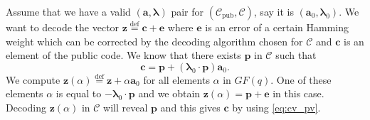 \documentclass[runningheads,11pt]{llncs}
\newcommand{\eqdef}{\stackrel{\text{def}}{=}}
\newcommand{\code}[1]{\ensuremath{\mathscr{#1}}}
\newcommand{\Cpub}{\code{C}_{\text{pub}}}
\newcommand{\CC}{\code{C}}
\newcommand{\scp}[2]{#1\cdot #2}
\newcommand{\word}[1]{\ensuremath{\boldsymbol{#1}}}
\newcommand{\av}{\word{a}}
\newcommand{\lambdav}{\word{\lambda}}
\newcommand{\cv}{\word{c}}
\newcommand{\ev}{\word{e}}
\newcommand{\pv}{\word{p}}
\newcommand{\zv}{\word{z}}
\newcommand{\fq}{GF(q)}
\begin{document}
Assume that we have a valid $(\av,\lambdav)$ pair for $(\Cpub,\CC)$, say it is $(\av_0,\lambdav_0)$.
We want to decode the vector $\zv \eqdef \cv +\ev$ where $\ev$ is an error of a certain Hamming weight which 
can be corrected by the decoding algorithm chosen for $\CC$ and $\cv$ is an element of the public code. We know that there exists 
$\pv$ in $\CC$ such that 
\begin{equation}
\label{eq:cv_pv}
\cv = \pv + (\scp{\lambdav_0}{\pv}) \av_0.
\end{equation}
We compute $\zv(\alpha) \eqdef \zv + \alpha \av_0$ for all elements 
$\alpha$ in $\fq$. One of these elements $\alpha$ is equal to $-\scp{\lambdav_0}{\pv}$  and 
we obtain $\zv(\alpha) = \pv + \ev$ in this case. Decoding $\zv(\alpha)$ in $\CC$ will reveal $\pv$ and
this gives $\cv$ by using \eqref{eq:cv_pv}.

 
\end{document}
